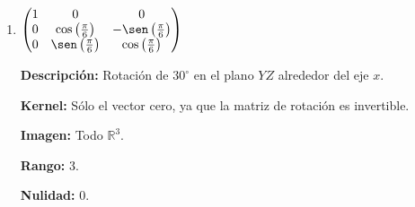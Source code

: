 \begin{prob}
\begin{enumerate}[$a)$]
\begin{myproof}
    \textbf{Nulidad:} $1$.

    \textbf{Gráfica} (Figura~\ref{fig:sudoku_proyeccion_yz})\textbf{:}
    \begin{figure}[H]
    \centering
    \caption{Proyección sobre el plano $YZ$.}\label{fig:sudoku_proyeccion_yz}
    \end{figure}
    \end{myproof}
    
    \item $\begin{pmatrix} 1 & 0 & 0 \\ 0 & \cos\left( \frac{\pi}{6} \right) & -\sen\left( \frac{\pi}{6} \right) \\ 0 & \sen\left( \frac{\pi}{6} \right) & \cos\left( \frac{\pi}{6} \right) \end{pmatrix}$
    \begin{myproof}
    \textbf{Descripción:} Rotación de $30^\circ$ en el plano $YZ$ alrededor del eje $x$.

    \textbf{Kernel:} Sólo el vector cero, ya que la matriz de rotación es invertible.

    \textbf{Imagen:} Todo $\mathbb{R}^3$.

    \textbf{Rango:} $3$.

    \textbf{Nulidad:} $0$.


\end{myproof}
\end{enumerate}
\end{prob}
